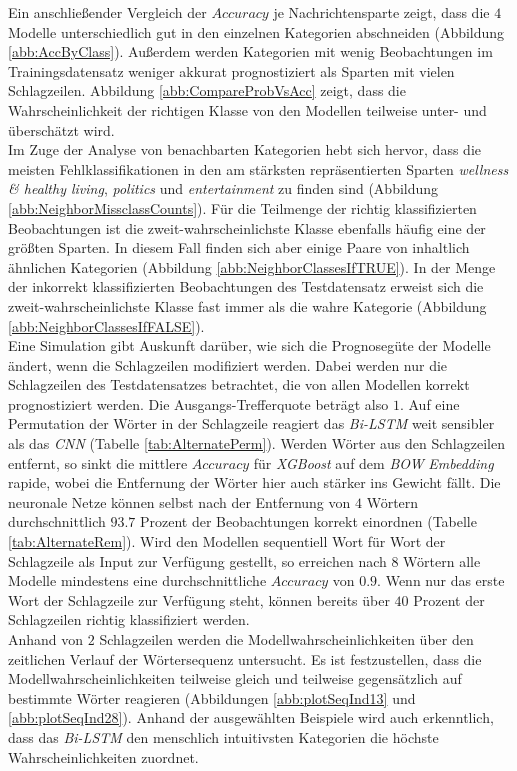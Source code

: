 \documentclass[a4paper,11pt]{article}
\begin{document}
Ein anschließender Vergleich der $Accuracy$ je Nachrichtensparte zeigt, dass die $4$ Modelle unterschiedlich gut in den einzelnen Kategorien abschneiden (Abbildung \ref{abb:AccByClass}). Außerdem werden Kategorien mit wenig Beobachtungen im Trainingsdatensatz weniger akkurat prognostiziert als Sparten mit vielen Schlagzeilen. Abbildung \ref{abb:CompareProbVsAcc} zeigt, dass die Wahrscheinlichkeit der richtigen Klasse von den Modellen teilweise unter- und überschätzt wird.\\
Im Zuge der Analyse von benachbarten Kategorien hebt sich hervor, dass die meisten Fehlklassifikationen in den am stärksten repräsentierten Sparten \textit{wellness \& healthy living}, \textit{politics} und \textit{entertainment} zu finden sind (Abbildung  \ref{abb:NeighborMissclassCounts}). Für die Teilmenge der richtig klassifizierten Beobachtungen ist die zweit-wahrscheinlichste Klasse ebenfalls häufig eine der größten Sparten. In diesem Fall finden sich aber einige Paare von inhaltlich ähnlichen Kategorien (Abbildung \ref{abb:NeighborClassesIfTRUE}). In der Menge der inkorrekt klassifizierten Beobachtungen des Testdatensatz erweist sich die zweit-wahrscheinlichste Klasse fast immer als die wahre Kategorie (Abbildung \ref{abb:NeighborClassesIfFALSE}).\\
Eine Simulation gibt Auskunft darüber, wie sich die Prognosegüte der Modelle ändert, wenn die Schlagzeilen modifiziert werden. Dabei werden nur die Schlagzeilen des Testdatensatzes betrachtet, die von allen Modellen korrekt prognostiziert werden. Die Ausgangs-Trefferquote beträgt also $1$. Auf eine Permutation der Wörter in der Schlagzeile reagiert das \textit{Bi-LSTM} weit sensibler als das \textit{CNN} (Tabelle \ref{tab:AlternatePerm}). Werden Wörter aus den Schlagzeilen entfernt, so sinkt die mittlere $Accuracy$ für \textit{XGBoost} auf dem \textit{BOW} \textit{Embedding} rapide, wobei die Entfernung der Wörter hier auch stärker ins Gewicht fällt. Die neuronale Netze können selbst nach der Entfernung von $4$ Wörtern durchschnittlich $93.7$ Prozent der Beobachtungen korrekt einordnen (Tabelle \ref{tab:AlternateRem}). Wird den Modellen sequentiell Wort für Wort der Schlagzeile als Input zur Verfügung gestellt, so erreichen nach $8$ Wörtern alle Modelle mindestens eine durchschnittliche $Accuracy$ von $0.9$. Wenn nur das erste Wort der Schlagzeile zur Verfügung steht, können bereits über $40$ Prozent der Schlagzeilen richtig klassifiziert werden. \\
Anhand von $2$ Schlagzeilen werden die Modellwahrscheinlichkeiten über den zeitlichen Verlauf der Wörtersequenz untersucht. Es ist festzustellen, dass die Modellwahrscheinlichkeiten teilweise gleich und teilweise gegensätzlich auf bestimmte Wörter reagieren (Abbildungen \ref{abb:plotSeqInd13} und \ref{abb:plotSeqInd28}). Anhand der ausgewählten Beispiele wird auch erkenntlich, dass das \textit{Bi-LSTM} den menschlich intuitivsten Kategorien die höchste Wahrscheinlichkeiten zuordnet. 
\end{document}
